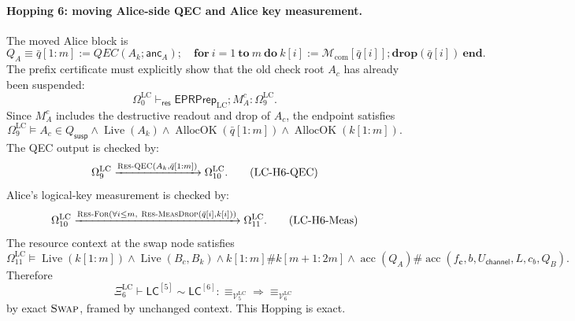 \documentclass{report}
\theoremstyle{defn_style}
\providecommand{\Live}{\operatorname{Live}}
\providecommand{\AllocOK}{\operatorname{AllocOK}}
\providecommand{\acc}{\operatorname{acc}}
\providecommand{\HopLC}[1]{\mathsf{LC}^{[#1]}}
\begin{document}
\paragraph{Hopping 6: moving Alice-side QEC and Alice key measurement.}
The moved Alice block is
\[
Q_A
\equiv
\bar q[1{:}m]:=QEC(A_k;\mathsf{anc}_A);
\quad
\mathbf{for}\ i=1\ \mathbf{to}\ m\ \mathbf{do}\ 
k[i]:=\mathcal M_{\mathrm{com}}[\bar q[i]];
\mathbf{drop}(\bar q[i])
\ \mathbf{end}.
\]
The prefix certificate must explicitly show that the old check root \(A_c\) has
already been suspended:
\[
\Omega^{\mathrm{LC}}_0
\vdash_{\mathsf{res}}
\mathsf{EPRPrep}_{\mathrm{LC}};
M_A^c
:
\Omega^{\mathrm{LC}}_9.
\tag{LC-H6-Prefix}\label{LC-H6-Prefix}
\]
Since \(M_A^c\) includes the destructive readout and drop of \(A_c\), the
endpoint satisfies
\[
\Omega^{\mathrm{LC}}_9
\models
A_c\in Q_{\mathsf{susp}}
\land
\Live(A_k)
\land
\AllocOK(\bar q[1{:}m])
\land
\AllocOK(k[1{:}m]).
\tag{LC-H6-QECReq}
\]
The QEC output is checked by:
\[
\Omega^{\mathrm{LC}}_9
\xrightarrow{\textsc{Res-QEC}(A_k,\bar q[1{:}m])}
\Omega^{\mathrm{LC}}_{10}.
\tag{LC-H6-QEC}
\]
Alice's logical-key measurement is checked by:
\[
\Omega^{\mathrm{LC}}_{10}
\xrightarrow{
  \textsc{Res-For}
  \left(
    \forall i\le m,\ 
    \textsc{Res-MeasDrop}(\bar q[i],k[i])
  \right)}
\Omega^{\mathrm{LC}}_{11}.
\tag{LC-H6-Meas}
\]
The resource context at the swap node satisfies
\[
\Omega^{\mathrm{LC}}_{11}
\models
\Live(k[1{:}m])
\land
\Live(B_c,B_k)
\land
k[1{:}m]\#k[m+1{:}2m]
\land
\acc(Q_A)\#\acc(f_{\mathbf c},b,U_{\mathsf{channel}},L,c_b,Q_B).
\tag{LC-H6-SwapReq}
\]
Therefore
\[
\Xi^{\mathrm{LC}}_6
\vdash
\HopLC{5}\sim\HopLC{6}:
\equiv_{\mathcal V^{\mathrm{LC}}_5}
\Longrightarrow
\equiv_{\mathcal V^{\mathrm{LC}}_6}
\tag{LC-H6-Rel}
\]
by exact \(\textsc{Swap}\), framed by unchanged context.  This Hopping is exact.
\end{document}

